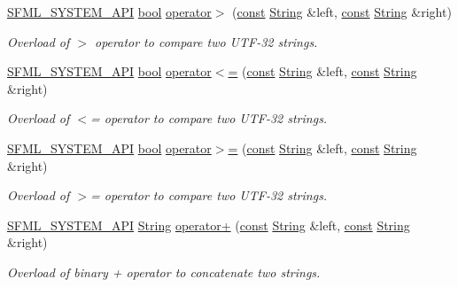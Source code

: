 \begin{DoxyCompactItemize}
\hyperlink{sfml_2dep_2_s_f_m_l-2_84_82_2include_2_s_f_m_l_2_system_2_export_8hpp_a6476c9e422606477a4c23d92b1d79a1f}{S\-F\-M\-L\-\_\-\-S\-Y\-S\-T\-E\-M\-\_\-\-A\-P\-I} \hyperlink{term__entry_8h_a002004ba5d663f149f6c38064926abac}{bool} \hyperlink{classsf_1_1_string_a5efc1eca58cf5c17d01eb8501d303538}{operator$>$} (\hyperlink{term__entry_8h_a57bd63ce7f9a353488880e3de6692d5a}{const} \hyperlink{classsf_1_1_string}{String} \&left, \hyperlink{term__entry_8h_a57bd63ce7f9a353488880e3de6692d5a}{const} \hyperlink{classsf_1_1_string}{String} \&right)
\begin{DoxyCompactList}\small\item\em Overload of $>$ operator to compare two U\-T\-F-\/32 strings. \end{DoxyCompactList}\item 
\hyperlink{sfml_2dep_2_s_f_m_l-2_84_82_2include_2_s_f_m_l_2_system_2_export_8hpp_a6476c9e422606477a4c23d92b1d79a1f}{S\-F\-M\-L\-\_\-\-S\-Y\-S\-T\-E\-M\-\_\-\-A\-P\-I} \hyperlink{term__entry_8h_a002004ba5d663f149f6c38064926abac}{bool} \hyperlink{classsf_1_1_string_abd342b6094b81cd086c7929b53b112ae}{operator$<$=} (\hyperlink{term__entry_8h_a57bd63ce7f9a353488880e3de6692d5a}{const} \hyperlink{classsf_1_1_string}{String} \&left, \hyperlink{term__entry_8h_a57bd63ce7f9a353488880e3de6692d5a}{const} \hyperlink{classsf_1_1_string}{String} \&right)
\begin{DoxyCompactList}\small\item\em Overload of $<$= operator to compare two U\-T\-F-\/32 strings. \end{DoxyCompactList}\item 
\hyperlink{sfml_2dep_2_s_f_m_l-2_84_82_2include_2_s_f_m_l_2_system_2_export_8hpp_a6476c9e422606477a4c23d92b1d79a1f}{S\-F\-M\-L\-\_\-\-S\-Y\-S\-T\-E\-M\-\_\-\-A\-P\-I} \hyperlink{term__entry_8h_a002004ba5d663f149f6c38064926abac}{bool} \hyperlink{classsf_1_1_string_a8d2979d7829d6616330a768956f251e1}{operator$>$=} (\hyperlink{term__entry_8h_a57bd63ce7f9a353488880e3de6692d5a}{const} \hyperlink{classsf_1_1_string}{String} \&left, \hyperlink{term__entry_8h_a57bd63ce7f9a353488880e3de6692d5a}{const} \hyperlink{classsf_1_1_string}{String} \&right)
\begin{DoxyCompactList}\small\item\em Overload of $>$= operator to compare two U\-T\-F-\/32 strings. \end{DoxyCompactList}\item 
\hyperlink{sfml_2dep_2_s_f_m_l-2_84_82_2include_2_s_f_m_l_2_system_2_export_8hpp_a6476c9e422606477a4c23d92b1d79a1f}{S\-F\-M\-L\-\_\-\-S\-Y\-S\-T\-E\-M\-\_\-\-A\-P\-I} \hyperlink{classsf_1_1_string}{String} \hyperlink{classsf_1_1_string_a55ef2bf7dc6b295ef7127b0bc1e58760}{operator+} (\hyperlink{term__entry_8h_a57bd63ce7f9a353488880e3de6692d5a}{const} \hyperlink{classsf_1_1_string}{String} \&left, \hyperlink{term__entry_8h_a57bd63ce7f9a353488880e3de6692d5a}{const} \hyperlink{classsf_1_1_string}{String} \&right)
\begin{DoxyCompactList}\small\item\em Overload of binary + operator to concatenate two strings. \end{DoxyCompactList}\end{DoxyCompactItemize}


